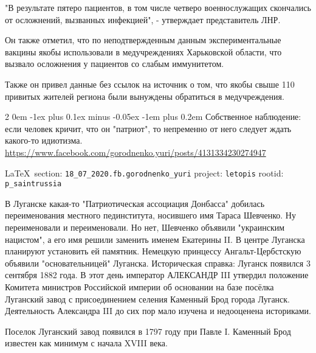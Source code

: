 \documentclass[a4paper,11pt]{extreport}
\makeatletter
\renewcommand\subsection{%
  \clearpage
    \@startsection{subsection}%
    {2}%
    {0em}%
    {-1ex plus 0.1ex minus -0.05ex}%
    {-1em plus 0.2em}%
    {\scshape\bfseries\Large}%
}
\makeatother
\begin{document}
"В результате пятеро пациентов, в том числе четверо военнослужащих скончались
от осложнений, вызванных инфекцией", - утверждает представитель ЛНР.

Он также отметил, что по неподтвержденным данным экспериментальные вакцины
якобы использовали в медучреждениях Харьковской области, что вызвало осложнения
у пациентов со слабым иммунитетом.

Также он привел данные без ссылок на источник о том, что якобы свыше 110
привитых жителей региона были вынуждены обратиться в медучреждения. 

 
 
  
\subsection{Собственное наблюдение: если человек кричит, что он "патриот", то непременно от него следует ждать какого-то идиотизма.}
\label{sec:18_07_2020.fb.gorodnenko_yuri}
\url{https://www.facebook.com/gorodnenko.yuri/posts/4131334230274947}

\vspace{0.5cm}
{\small\LaTeX~section: \verb|18_07_2020.fb.gorodnenko_yuri| project: \verb|letopis| rootid: \verb|p_saintrussia|}
\vspace{0.5cm}

В Луганске какая-то "Патриотическая ассоциация Донбасса" добилась
переименования местного пединститута, носившего имя Тараса Шевченко. Ну
переименовали и переименовали. Но нет, Шевченко объявили "украинским нацистом",
а его имя решили заменить именем Екатерины II. В центре Луганска планируют
установить ей памятник. Немецкую принцессу Ангальт-Цербстскую объявили
"основательницей" Луганска.  Историческая справка: Луганск появился 3 сентября
1882 года. В этот день император АЛЕКСАНДР III утвердил положение Комитета
министров Российской империи об основании на базе посёлка Луганский завод с
присоединением селения Каменный Брод города Луганск. Деятельность Александра
III до сих пор мало изучена и недооценена историками.

Поселок Луганский завод появился в 1797 году при Павле I. Каменный Брод
известен как минимум с начала XVIII века.
\end{document}
